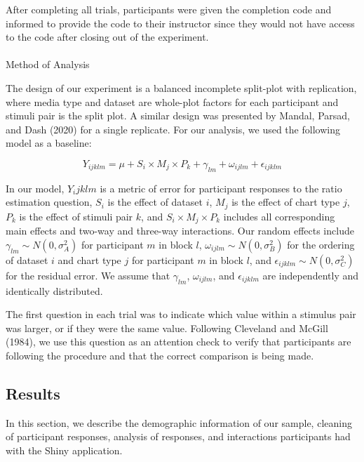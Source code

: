 \documentclass[
  letterpaper,
  DIV=11,
  numbers=noendperiod]{scrartcl}
\makeatletter
\let\oldparagraph\paragraph
\renewcommand{\paragraph}{
    \@ifstar
      \xxxParagraphStar
      \xxxParagraphNoStar
  }
\newcommand{\xxxParagraphStar}[1]{\oldparagraph*{#1}\mbox{}}
\newcommand{\xxxParagraphNoStar}[1]{\oldparagraph{#1}\mbox{}}
\makeatother
\begin{document}
After completing all trials, participants were given the completion code
and informed to provide the code to their instructor since they would
not have access to the code after closing out of the experiment.

\paragraph{Method of Analysis}\label{method-of-analysis}

The design of our experiment is a balanced incomplete split-plot with
replication, where media type and dataset are whole-plot factors for
each participant and stimuli pair is the split plot. A similar design
was presented by Mandal, Parsad, and Dash (2020) for a single replicate.
For our analysis, we used the following model as a baseline:

\[
Y_{ijklm}=\mu+S_i\times M_j\times P_k+\gamma_{lm}+\omega_{ijlm}+\epsilon_{ijklm}
\]

In our model, \(Y_ijklm\) is a metric of error for participant responses
to the ratio estimation question, \(S_i\) is the effect of dataset
\(i\), \(M_j\) is the effect of chart type \(j\), \(P_k\) is the effect
of stimuli pair \(k\), and \(S_i\times M_j\times P_k\) includes all
corresponding main effects and two-way and three-way interactions. Our
random effects include \(\gamma_{lm}\sim N(0,\sigma^2_A)\) for
participant \(m\) in block \(l\), \(\omega_{ijlm}\sim N(0,\sigma^2_B)\)
for the ordering of dataset \(i\) and chart type \(j\) for participant
\(m\) in block \(l\), and \(\epsilon_{ijklm}\sim N(0, \sigma^2_C)\) for
the residual error. We assume that \(\gamma_{lm}\), \(\omega_{ijlm}\),
and \(\epsilon_{ijklm}\) are independently and identically distributed.

The first question in each trial was to indicate which value within a
stimulus pair was larger, or if they were the same value. Following
Cleveland and McGill (1984), we use this question as an attention check
to verify that participants are following the procedure and that the
correct comparison is being made.

\subsection{Results}\label{results}

In this section, we describe the demographic information of our sample,
cleaning of participant responses, analysis of responses, and
interactions participants had with the Shiny application.
\end{document}
